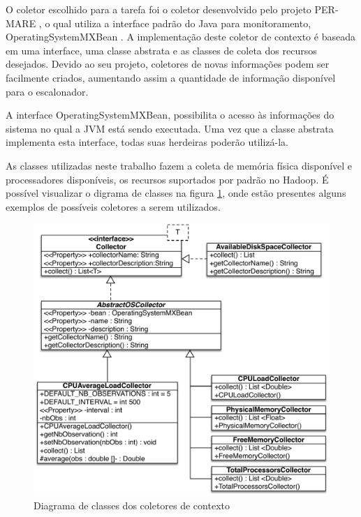 O coletor escolhido para a tarefa foi o coletor desenvolvido pelo projeto PER-MARE \cite{Collector}, o qual utiliza a interface padrão do Java para monitoramento, OperatingSystemMXBean \cite{MXBean}. A implementação deste coletor de contexto é baseada em uma interface, uma classe abstrata e as classes de coleta dos recursos desejados. Devido ao seu projeto, coletores de novas informações podem ser facilmente criados, aumentando assim a quantidade de informação disponível para o escalonador.

A interface OperatingSystemMXBean, possibilita o acesso às informações do sistema no qual a JVM está sendo executada. Uma vez que a classe abstrata implementa esta interface, todas suas herdeiras poderão utilizá-la.

As classes utilizadas neste trabalho fazem a coleta de memória física disponível e processadores disponíveis, os recursos suportados por padrão no Hadoop. É possível visualizar o digrama de classes na figura \ref{fig:collectorUML}, onde estão presentes alguns exemplos de possíveis coletores a serem utilizados.

\begin{figure}[!hbtn]
   \centering
   \includegraphics[width=15cm]{figuras/CollectorUML2.pdf}
   \caption{Diagrama de classes dos coletores de contexto}
   \label{fig:collectorUML}
\end{figure}

